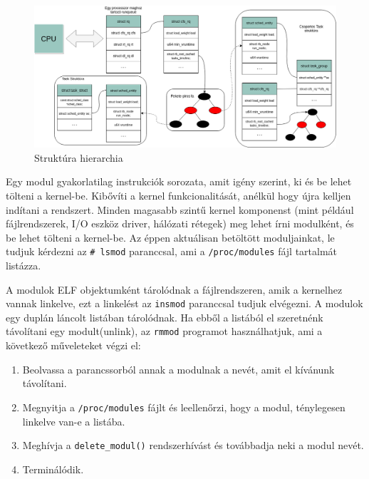 \begin{figure}[h!]
\centering
\includegraphics[width=\textwidth]{images/structureHierarchy.png}
\caption{Struktúra hierarchia}
\label{fig:structurehierarchi}
\end{figure}


Egy modul gyakorlatilag instrukciók sorozata, amit igény szerint, ki és be lehet tölteni a kernel-be. Kibővíti a kernel funkcionalitását, anélkül hogy újra kelljen indítani a rendszert. Minden magasabb szintű kernel komponenst (mint például fájlrendszerek, I/O eszköz driver, hálózati rétegek) meg lehet írni modulként, és be lehet tölteni a kernel-be.
Az éppen aktuálisan betöltött moduljainkat, le tudjuk kérdezni az \texttt{\# lsmod} paranccsal, ami a \texttt{/proc/modules} fájl tartalmát listázza.

A modulok ELF objektumként tárolódnak a fájlrendszeren, amik a kernelhez vannak linkelve, ezt a linkelést az \texttt{insmod} paranccsal tudjuk elvégezni.
A modulok egy duplán láncolt listában tárolódnak.
Ha ebből a listából el szeretnénk távolítani egy modult(unlink), az \texttt{rmmod} programot használhatjuk, ami a következő műveleteket végzi el:
\begin{enumerate}
	\item Beolvassa a parancssorból annak a modulnak a nevét, amit el kívánunk távolítani.
	\item Megnyitja a \texttt{/proc/modules} fájlt és leellenőrzi, hogy a modul, ténylegesen linkelve van-e a listába.
	\item Meghívja a \texttt{delete\_modul()} rendszerhívást és továbbadja neki a modul nevét.
	\item Terminálódik.
\end{enumerate} 


